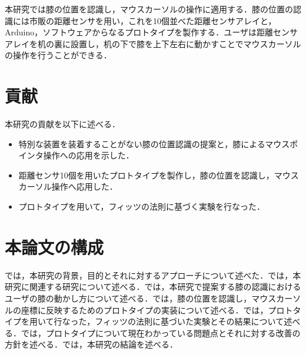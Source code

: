 本研究では膝の位置を認識し，マウスカーソルの操作に適用する．膝の位置の認識には市販の距離センサを用い，これを10個並べた距離センサアレイと，Arduino，ソフトウェアからなるプロトタイプを製作する．ユーザは距離センサアレイを机の裏に設置し，机の下で膝を上下左右に動かすことでマウスカーソルの操作を行うことができる．

\section{貢献}
本研究の貢献を以下に述べる．
\begin{itemize}
	\item 特別な装置を装着することがない膝の位置認識の提案と，膝によるマウスポインタ操作への応用を示した．
	\item 距離センサ10個を用いたプロトタイプを製作し，膝の位置を認識し，マウスカーソル操作へ応用した．
	\item プロトタイプを用いて，フィッツの法則に基づく実験を行なった．
\end{itemize}
\section{本論文の構成}
では，本研究の背景，目的とそれに対するアプローチについて述べた．では，本研究に関連する研究について述べる．では，本研究で提案する膝の認識におけるユーザの膝の動かし方について述べる．では，膝の位置を認識し，マウスカーソルの座標に反映するためのプロトタイプの実装について述べる．では，プロトタイプを用いて行なった，フィッツの法則に基づいた実験とその結果について述べる．では，プロトタイプについて現在わかっている問題点とそれに対する改善の方針を述べる．では，本研究の結論を述べる．

\begin{comment}
	\fixme{
	\begin{itemize}
		\item 本研究では膝によるマウスカーソル操作を調査する？
		\item 足を使ってみたい
		\item 足先の研究しかない，膝と組み合わせることで様々なインタラクションが可能になる
		\item 膝使ったものは少なく問題がある
		\item 膝を使ったことの理由→足の既存手法と組み合わせることができる，膝の可動域が広い（が先行研究が少ない
		\item いずれにせよ，関連研究が終わるまでに「膝によるマウスカーソル操作」という話に落とし込む
	\end{itemize}
}
\end{comment}
